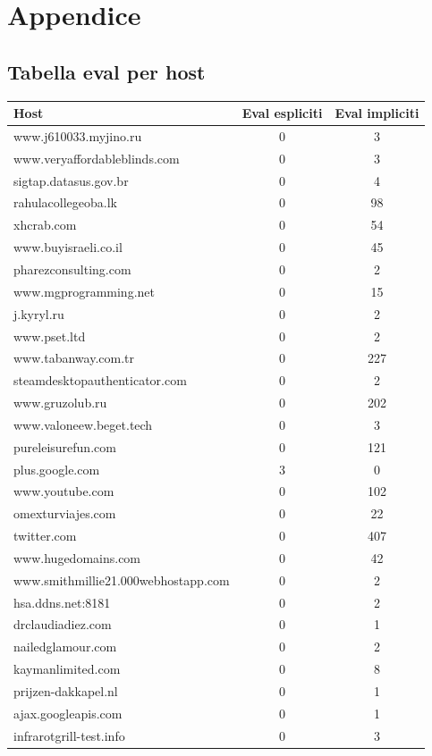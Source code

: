 \documentclass[a4paper, 11pt, oneside]{report}
\begin{document}
\chapter{Appendice}
\section{Tabella eval per host}\label{tabella}
\begin{longtable}[!ht]{|l|c|c|}
    \hline
    \textbf{Host} & \textbf{Eval espliciti} & \textbf{Eval impliciti}  \\
    \hline
   	www.j610033.myjino.ru&0&3\\
\hline
www.veryaffordableblinds.com&0&3\\
\hline
sigtap.datasus.gov.br&0&4\\
\hline
rahulacollegeoba.lk&0&98\\
\hline
xhcrab.com&0&54\\
\hline
www.buyisraeli.co.il&0&45\\
\hline
pharezconsulting.com&0&2\\
\hline
www.mgprogramming.net&0&15\\
\hline
j.kyryl.ru&0&2\\
\hline
www.pset.ltd&0&2\\
\hline
www.tabanway.com.tr&0&227\\
\hline
steamdesktopauthenticator.com&0&2\\
\hline
www.gruzolub.ru&0&202\\
\hline
www.valoneew.beget.tech&0&3\\
\hline
pureleisurefun.com&0&121\\
\hline
plus.google.com&3&0\\
\hline
www.youtube.com&0&102\\
\hline
omexturviajes.com&0&22\\
\hline
twitter.com&0&407\\
\hline
www.hugedomains.com&0&42\\
\hline
www.smithmillie21.000webhostapp.com&0&2\\
\hline
hsa.ddns.net:8181&0&2\\
\hline
drclaudiadiez.com&0&1\\
\hline
nailedglamour.com&0&2\\
\hline
kaymanlimited.com&0&8\\
\hline
prijzen-dakkapel.nl&0&1\\
\hline
ajax.googleapis.com&0&1\\
\hline
infrarotgrill-test.info&0&3\\

\end{longtable}
\end{document}
